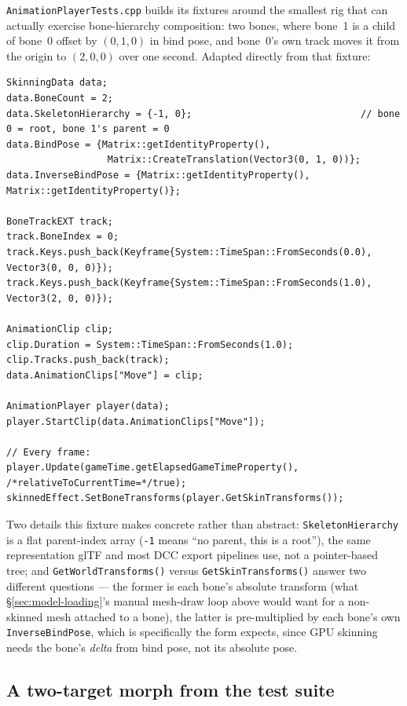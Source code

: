 \texttt{AnimationPlayerTests.cpp} builds its fixtures around the smallest rig that can
actually exercise bone-hierarchy composition: two bones, where bone~1 is a child of bone~0
offset by $(0,1,0)$ in bind pose, and bone~0's own track moves it from the origin to
$(2,0,0)$ over one second. Adapted directly from that fixture:

\begin{lstlisting}
SkinningData data;
data.BoneCount = 2;
data.SkeletonHierarchy = {-1, 0};                              // bone 0 = root, bone 1's parent = 0
data.BindPose = {Matrix::getIdentityProperty(),
                  Matrix::CreateTranslation(Vector3(0, 1, 0))};
data.InverseBindPose = {Matrix::getIdentityProperty(), Matrix::getIdentityProperty()};

BoneTrackEXT track;
track.BoneIndex = 0;
track.Keys.push_back(Keyframe{System::TimeSpan::FromSeconds(0.0), Vector3(0, 0, 0)});
track.Keys.push_back(Keyframe{System::TimeSpan::FromSeconds(1.0), Vector3(2, 0, 0)});

AnimationClip clip;
clip.Duration = System::TimeSpan::FromSeconds(1.0);
clip.Tracks.push_back(track);
data.AnimationClips["Move"] = clip;

AnimationPlayer player(data);
player.StartClip(data.AnimationClips["Move"]);

// Every frame:
player.Update(gameTime.getElapsedGameTimeProperty(), /*relativeToCurrentTime=*/true);
skinnedEffect.SetBoneTransforms(player.GetSkinTransforms());
\end{lstlisting}

Two details this fixture makes concrete rather than abstract: \texttt{SkeletonHierarchy} is a
flat parent-index array (\texttt{-1} means ``no parent, this is a root''), the same
representation glTF and most DCC export pipelines use, not a pointer-based tree; and
\texttt{GetWorldTransforms()} versus \texttt{GetSkinTransforms()} answer two different
questions --- the former is each bone's absolute transform (what \S\ref{sec:model-loading}'s
manual mesh-draw loop above would want for a non-skinned mesh attached to a bone), the latter
is pre-multiplied by each bone's own \texttt{InverseBindPose}, which is specifically the form
 expects, since GPU skinning needs the bone's
\emph{delta} from bind pose, not its absolute pose.

\subsection{A two-target morph from the test suite}

